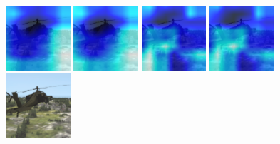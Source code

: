 \begin{figure}[H]
  {\includegraphics[height=2.4cm, width=2.4cm]{images/vbs3/gradcam/5-1/2/Heat_map_of_iterations_0.png}}
  {\includegraphics[height=2.4cm, width=2.4cm]{images/vbs3/gradcam/5-1/2/Heat_map_of_iterations_1.png}}
  {\includegraphics[height=2.4cm, width=2.4cm]{images/vbs3/gradcam/5-1/2/Heat_map_of_iterations_3.png}}
%
  {\includegraphics[height=2.4cm, width=2.4cm]{images/vbs3/gradcam/5-1/2/Heat_map_of_iterations_5.png}}
  {\includegraphics[height=2.4cm, width=2.4cm]{images/vbs3/gradcam/5-1/2/Test_Images.png}}
  

\end{figure}
